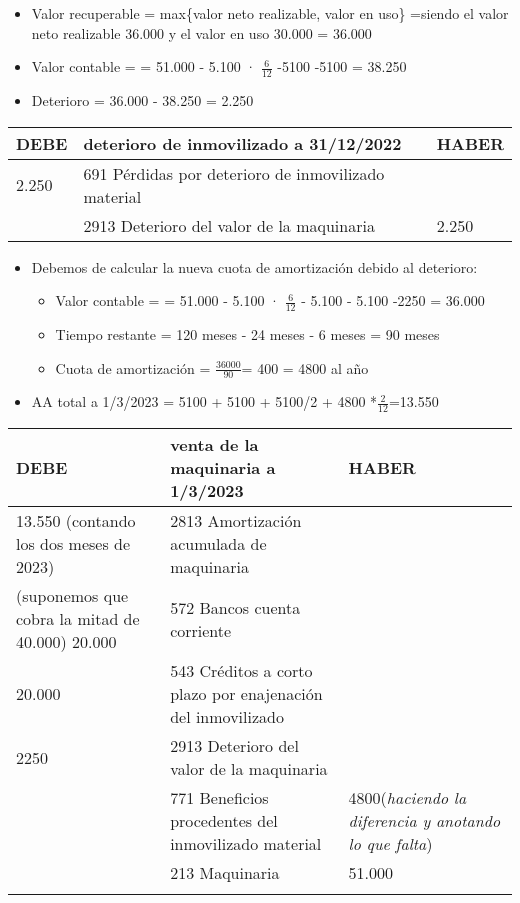 \documentclass[a4paper,12pt]{article}
\newcommand{\fec}{31/12/}
\newcommand{\AAMAQ}{2813 Amortización acumulada de maquinaria }
\newcommand{\valorrecuperable}{Valor recuperable = max\{valor neto realizable, valor en uso\} =}
\newcommand{\PDI}{691 Pérdidas por deterioro de inmovilizado material}
\newcommand{\DVM}{2913 Deterioro del valor de la maquinaria }
\newcommand{\VC}{Valor contable = }
\newcommand{\bancos}{572 Bancos cuenta corriente}
\newcommand{\cuotaamort}{Cuota de amortización = }
\newcommand{\enajenacion}{543 Créditos a corto plazo por enajenación del inmovilizado}
\newcommand{\benefIM}{771 Beneficios procedentes del inmovilizado material}
\newcommand{\myequation}[2]{\ensuremath{\frac{#1}{#2}}}
\begin{document}
\begin{itemize}
    \item \valorrecuperable siendo el valor neto realizable 36.000 y el valor en uso 30.000 = 36.000
    \item \VC = 51.000 - 5.100 · $\frac{6}{12}$ -5100 -5100 = 38.250
    \item Deterioro = 36.000 - 38.250 = 2.250
\end{itemize}

\begin{table}[H]
    \centering
    \begin{tabular}{|p{3cm}|p{6cm}|p{3cm}|}
    \hline
    \textbf{DEBE} & \textbf{deterioro de inmovilizado a \fec2022} & \textbf{HABER} \\
    \hline
    2.250& \PDI& \\
    \hline
    & \DVM & 2.250\\
    \hline
    \end{tabular}
\end{table}

\begin{itemize}
    \item Debemos de calcular la nueva cuota de amortización debido al deterioro:
    \begin{itemize}
        \item \VC = 51.000 - 5.100 · $\frac{6}{12}$ - 5.100 - 5.100 -2250 = 36.000
        \item Tiempo restante = 120 meses - 24 meses - 6 meses = 90 meses
        \item \cuotaamort \myequation{36000}{90}=   400 = 4800 al año 
    \end{itemize}
    \item  AA total a 1/3/2023 = 5100 + 5100 + 5100/2 + 4800 *\myequation{2}{12}=13.550
\end{itemize}



\begin{table}[H]
    \centering
    \begin{tabular}{|p{3cm}|p{6cm}|p{3cm}|}
    \hline
    \textbf{DEBE} & \textbf{venta de la maquinaria a 1/3/2023} & \textbf{HABER} \\
    \hline
    13.550 (contando los dos meses de 2023)& \AAMAQ & \\
    \hline
    (suponemos que cobra la mitad de 40.000) 20.000& \bancos & \\
    \hline
    20.000 & \enajenacion & \\
    \hline
    2250&\DVM &\\
    \hline
    & \benefIM &4800(\textit{haciendo la diferencia y anotando lo que falta})\\
    \hline
    & 213 Maquinaria & 51.000\\
    \hline
    &  & \\
    \hline
    \end{tabular}
\end{table}
\end{document}
